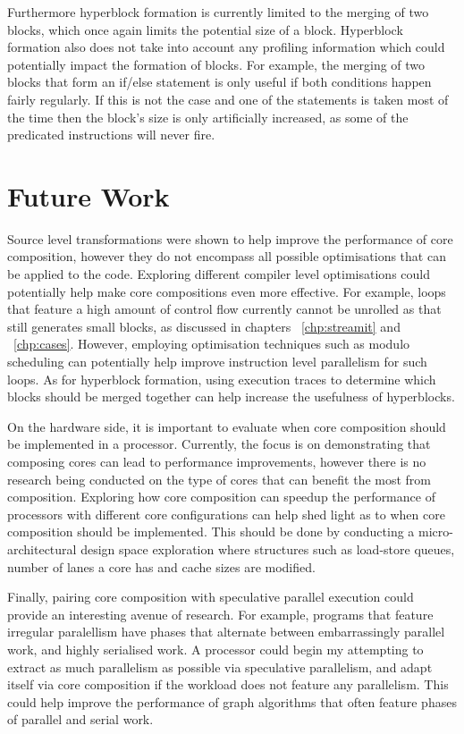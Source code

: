 Furthermore hyperblock formation is currently limited to the merging of two blocks, which once again limits the potential size of a block.
Hyperblock formation also does not take into account any profiling information which could potentially impact the formation of blocks.
For example, the merging of two blocks that form an if/else statement is only useful if both conditions happen fairly regularly.
If this is not the case and one of the statements is taken most of the time then the block's size is only artificially increased, as some of the predicated instructions will never fire.


\section{Future Work}

Source level transformations were shown to help improve the performance of core composition, however they do not encompass all possible optimisations that can be applied to the code.
Exploring different compiler level optimisations could potentially help make core compositions even more effective.
For example, loops that feature a high amount of control flow currently cannot be unrolled as that still generates small blocks, as discussed in chapters ~\ref{chp:streamit} and ~\ref{chp:cases}.
However, employing optimisation techniques such as modulo scheduling can potentially help improve instruction level parallelism for such loops.
As for hyperblock formation, using execution traces to determine which blocks should be merged together can help increase the usefulness of hyperblocks.

On the hardware side, it is important to evaluate when core composition should be implemented in a processor.
Currently, the focus is on demonstrating that composing cores can lead to performance improvements, however there is no research being conducted on the type of cores that can benefit the most from composition.
Exploring how core composition can speedup the performance of processors with different core configurations can help shed light as to when core composition should be implemented.
This should be done by conducting a micro-architectural design space exploration where structures such as load-store queues, number of lanes a core has and cache sizes are modified.

Finally, pairing core composition with speculative parallel execution could provide an interesting avenue of research.
For example, programs that feature irregular paralellism have phases that alternate between embarrassingly parallel work, and highly serialised work.
A processor could begin my attempting to extract as much parallelism as possible via speculative parallelism, and adapt itself via core composition if the workload does not feature any parallelism.
This could help improve the performance of graph algorithms that often feature phases of parallel and serial work.
